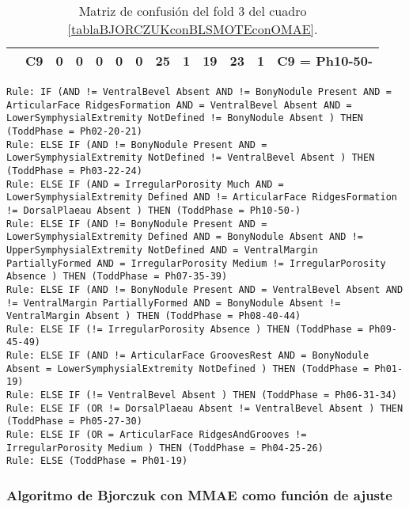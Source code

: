 \begin{table}[H]
{\begin{tabular}{|ccrrrrrrrrrrc|}
\multicolumn{1}{|c|}{}                                      & \multicolumn{1}{c|}{C9} & \multicolumn{1}{c|}{0}  & \multicolumn{1}{c|}{0}  & \multicolumn{1}{c|}{0}  & \multicolumn{1}{c|}{0}  & \multicolumn{1}{c|}{0}  & \multicolumn{1}{c|}{\textbf{25}} & \multicolumn{1}{c|}{\textbf{1}}  & \multicolumn{1}{c|}{\textbf{19}} & \multicolumn{1}{c|}{\textbf{23}} & \multicolumn{1}{c|}{\textbf{1}}  & C9 = Ph10-50-     \\ \hline
\end{tabular}%
}
\caption{Matriz de confusión del fold 3 del cuadro \ref{tablaBJORCZUKconBLSMOTEconOMAE}.}

\end{table}


\begin{lstlisting}
Rule: IF (AND != VentralBevel Absent AND != BonyNodule Present AND = ArticularFace RidgesFormation AND = VentralBevel Absent AND = LowerSymphysialExtremity NotDefined != BonyNodule Absent ) THEN (ToddPhase = Ph02-20-21)
Rule: ELSE IF (AND != BonyNodule Present AND = LowerSymphysialExtremity NotDefined != VentralBevel Absent ) THEN (ToddPhase = Ph03-22-24)
Rule: ELSE IF (AND = IrregularPorosity Much AND = LowerSymphysialExtremity Defined AND != ArticularFace RidgesFormation != DorsalPlaeau Absent ) THEN (ToddPhase = Ph10-50-)
Rule: ELSE IF (AND != BonyNodule Present AND = LowerSymphysialExtremity Defined AND = BonyNodule Absent AND != UpperSymphysialExtremity NotDefined AND = VentralMargin PartiallyFormed AND = IrregularPorosity Medium != IrregularPorosity Absence ) THEN (ToddPhase = Ph07-35-39)
Rule: ELSE IF (AND != BonyNodule Present AND = VentralBevel Absent AND != VentralMargin PartiallyFormed AND = BonyNodule Absent != VentralMargin Absent ) THEN (ToddPhase = Ph08-40-44)
Rule: ELSE IF (!= IrregularPorosity Absence ) THEN (ToddPhase = Ph09-45-49)
Rule: ELSE IF (AND != ArticularFace GroovesRest AND = BonyNodule Absent = LowerSymphysialExtremity NotDefined ) THEN (ToddPhase = Ph01-19)
Rule: ELSE IF (!= VentralBevel Absent ) THEN (ToddPhase = Ph06-31-34)
Rule: ELSE IF (OR != DorsalPlaeau Absent != VentralBevel Absent ) THEN (ToddPhase = Ph05-27-30)
Rule: ELSE IF (OR = ArticularFace RidgesAndGrooves != IrregularPorosity Medium ) THEN (ToddPhase = Ph04-25-26)
Rule: ELSE (ToddPhase = Ph01-19)
\end{lstlisting}




\subsubsection{Algoritmo de Bjorczuk con MMAE como función de ajuste}

